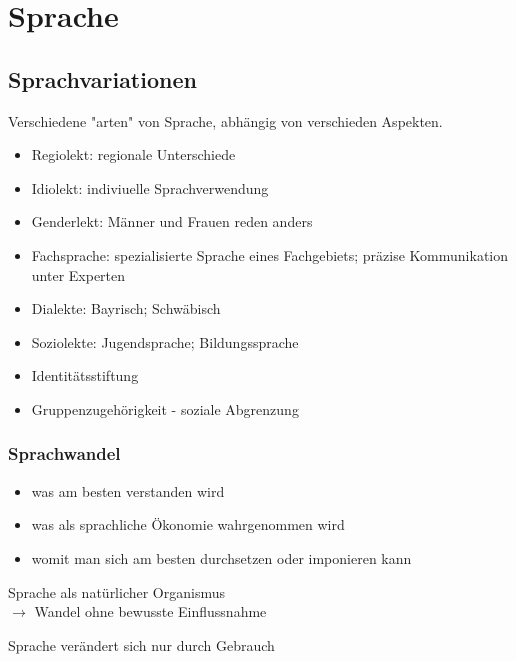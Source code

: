
\section{Sprache}

\subsection{Sprachvariationen}

Verschiedene "arten" von Sprache, abhängig von verschieden Aspekten.

\begin{itemize}
    \item Regiolekt: regionale Unterschiede
    \item Idiolekt: indiviuelle Sprachverwendung
    \item Genderlekt: Männer und Frauen reden anders
    \item Fachsprache: spezialisierte Sprache eines Fachgebiets; präzise Kommunikation unter Experten
    \item Dialekte: Bayrisch; Schwäbisch
    \item Soziolekte: Jugendsprache; Bildungssprache
\end{itemize}

\begin{itemize}
    \item Identitätsstiftung
    \item Gruppenzugehörigkeit - soziale Abgrenzung
\end{itemize}


\subsubsection{Sprachwandel}

\begin{itemize}
    \item was am besten verstanden wird
    \item was als sprachliche Ökonomie wahrgenommen wird
    \item womit man sich am besten durchsetzen oder imponieren kann
\end{itemize}

Sprache als natürlicher Organismus \\
$\rightarrow$ Wandel ohne bewusste Einflussnahme

Sprache verändert sich nur durch Gebrauch

